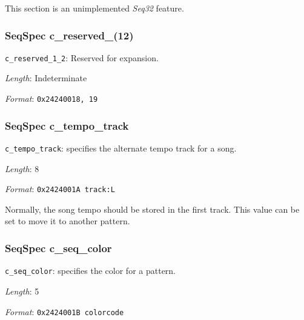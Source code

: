    This section is an unimplemented \textsl{Seq32} feature.

\subsubsection{SeqSpec c\_reserved\_(12)}
\label{subsubsec:midi_format_track_seqspec_reserved_1_2}

   \begin{description}
      \item \texttt{c\_reserved\_1\_2}: Reserved for expansion.
      \item \textsl{Length}: Indeterminate
      \item \textsl{Format}: \texttt{0x24240018, 19}
   \end{description}

\subsubsection{SeqSpec c\_tempo\_track}
\label{subsubsec:midi_format_track_seqspec_tempo_track}

   \begin{description}
      \item \texttt{c\_tempo\_track}:
         specifies the alternate tempo track for a song.
      \item \textsl{Length}: 8
      \item \textsl{Format}: \texttt{0x2424001A track:L}
   \end{description}

   Normally, the song tempo should be stored in the first track.
   This value can be set to move it to another pattern.

\subsubsection{SeqSpec c\_seq\_color}
\label{subsubsec:midi_format_track_seqspec_seq_color}

   \begin{description}
      \item \texttt{c\_seq\_color}: specifies the color for a pattern.
      \item \textsl{Length}: 5
      \item \textsl{Format}: \texttt{0x2424001B colorcode}
   \end{description}

